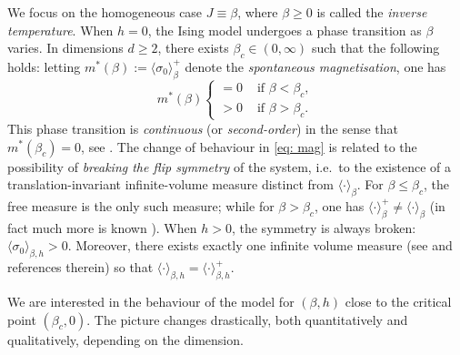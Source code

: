 \documentclass[11pt,a4paper]{article}
\numberwithin{equation}{section}
\theoremstyle{plain}
\theoremstyle{definition}
\begin{document}
We focus on the homogeneous case $J\equiv \beta$, where $\beta\geq 0$ is called the \emph{inverse temperature}. When $h=0$, the Ising model undergoes a phase transition as $\beta$ varies. In dimensions $d\geq 2$, there exists $\beta_c\in (0,\infty)$ \cite{PeierlsIsing1936} such that the following holds: letting $m^*(\beta):=\langle \sigma_0\rangle_{\beta}^+$ denote the \emph{spontaneous magnetisation}, one has
\begin{equation}\label{eq: mag}
	m^*(\beta)\begin{cases}\displaystyle=0 &\text{ if }\beta<\beta_c,\\
    \displaystyle>0&\text{ if }\beta>\beta_c.\end{cases}
\end{equation}
This phase transition is \emph{continuous} (or \emph{second-order}) in the sense that $m^*(\beta_c)=0$, see \cite{Yang1952spontaneous,AizenmanFernandezCriticalBehaviorMagnetization1986,WernerPercolationEtModeledIsing2009,AizenmanDuminilSidoraviciusContinuityIsing2015}. The change of behaviour in \eqref{eq: mag} is related to the possibility of \emph{breaking the flip symmetry} of the system, i.e.~to the existence of a translation-invariant infinite-volume measure distinct from $\langle \cdot \rangle_{\beta}$. For $\beta\leq \beta_c$, the free measure is the only such measure; while for $\beta>\beta_c$, one has $\langle \cdot\rangle_{\beta}^+\neq \langle \cdot\rangle_{\beta}$ (in fact much more is known \cite{BodineauTranslationGibbsIsing2006,RaoufiGibbsMeasures}). When $h>0$, the symmetry is always broken: $\langle \sigma_0\rangle_{\beta,h}>0$. Moreover, there exists exactly one infinite volume measure (see \cite{FriedliVelenikIntroStatMech2017} and references therein) so that $\langle \cdot\rangle_{\beta,h}=\langle \cdot\rangle_{\beta,h}^+$. 

\vspace{4pt}

We are interested in the behaviour of the model for $(\beta,h)$ close to 
the critical point $(\beta_c,0)$. The picture changes drastically, both quantitatively and qualitatively, depending on the dimension.
\end{document}
